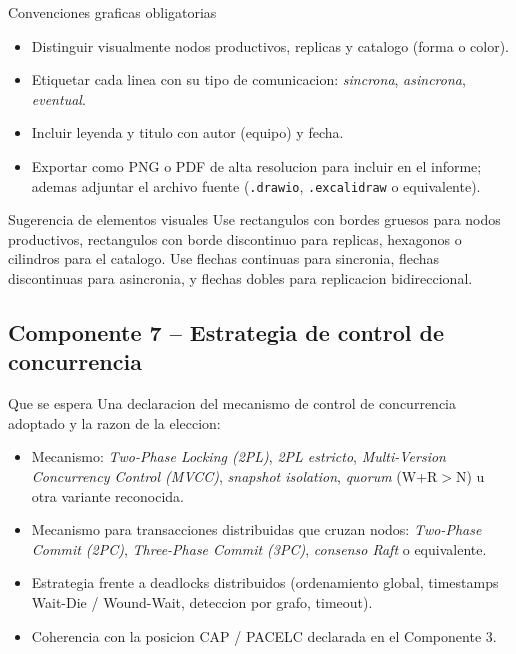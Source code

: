 \documentclass[11pt,a4paper]{article}
\newcommand{\codigo}[1]{\texttt{\textcolor{uteqBlue}{#1}}}
\begin{document}
\begin{cajaalerta}{Convenciones graficas obligatorias}
\begin{itemize}
\item Distinguir visualmente nodos productivos, replicas y catalogo (forma o color).
\item Etiquetar cada linea con su tipo de comunicacion: \emph{sincrona}, \emph{asincrona}, \emph{eventual}.
\item Incluir leyenda y titulo con autor (equipo) y fecha.
\item Exportar como PNG o PDF de alta resolucion para incluir en el informe; ademas adjuntar el archivo fuente (\codigo{.drawio}, \codigo{.excalidraw} o equivalente).
\end{itemize}
\end{cajaalerta}

\begin{cajaejemplo}{Sugerencia de elementos visuales}
Use rectangulos con bordes gruesos para nodos productivos, rectangulos con borde discontinuo para replicas, hexagonos o cilindros para el catalogo. Use flechas continuas para sincronia, flechas discontinuas para asincronia, y flechas dobles para replicacion bidireccional.
\end{cajaejemplo}

\subsection{Componente 7 -- Estrategia de control de concurrencia}

\begin{cajadefinicion}{Que se espera}
Una declaracion del mecanismo de control de concurrencia adoptado y la razon de la eleccion:
\begin{itemize}
\item Mecanismo: \emph{Two-Phase Locking (2PL)}, \emph{2PL estricto}, \emph{Multi-Version Concurrency Control (MVCC)}, \emph{snapshot isolation}, \emph{quorum} (W+R$>$N) u otra variante reconocida.
\item Mecanismo para transacciones distribuidas que cruzan nodos: \emph{Two-Phase Commit (2PC)}, \emph{Three-Phase Commit (3PC)}, \emph{consenso Raft} o equivalente.
\item Estrategia frente a deadlocks distribuidos (ordenamiento global, timestamps Wait-Die / Wound-Wait, deteccion por grafo, timeout).
\item Coherencia con la posicion CAP / PACELC declarada en el Componente 3.
\end{itemize}
\end{cajadefinicion}
\end{document}
